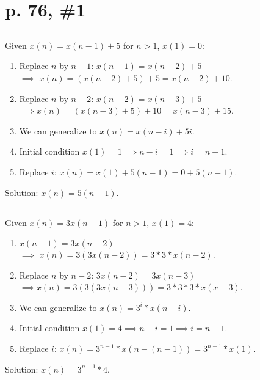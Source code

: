 \documentclass{article}
\begin{document}
\section{p. 76, \#1}

\subsection{}
Given $x(n) = x(n-1) + 5$ for $n>1$, $x(1) = 0$:
\begin{enumerate}
    \item Replace $n$ by $n-1$: $x(n-1) = x(n-2) + 5$\\
          $\implies$ $x(n) = (x(n-2) + 5) + 5 = x(n-2) + 10$.
    \item Replace $n$ by $n-2$: $x(n-2) = x(n-3) + 5$\\
          $\implies x(n) = (x(n-3) + 5) + 10 = x(n-3) + 15$.
    \item We can generalize to $x(n) = x(n-i) + 5i$.
    \item Initial condition $x(1) = 1 \implies n - i = 1 \implies i = n-1$.
    \item Replace $i$: $x(n) = x(1) + 5(n-1) = 0 + 5(n-1)$.
\end{enumerate}
Solution: $x(n) = 5(n-1)$.

\subsection{}
Given $x(n) = 3x(n-1)$ for $n>1$, $x(1) = 4$:
\begin{enumerate}
    \item $x(n-1) = 3x(n-2)$\\
          $\implies$ $x(n) = 3(3x(n-2)) = 3*3*x(n-2)$.
    \item Replace $n$ by $n-2$: $3x(n-2) = 3x(n-3)$\\
          $\implies x(n) = 3(3(3x(n-3))) = 3*3*3*x(x-3)$.
    \item We can generalize to $x(n) = 3^i * x(n-i)$.
    \item Initial condition $x(1) = 4 \implies n - i = 1 \implies i = n - 1$.
    \item Replace $i$: $x(n) = 3^{n-1} * x(n-(n-1)) = 3^{n-1} * x(1)$.
\end{enumerate}
Solution: $x(n) = 3^{n-1} * 4$.
\end{document}
